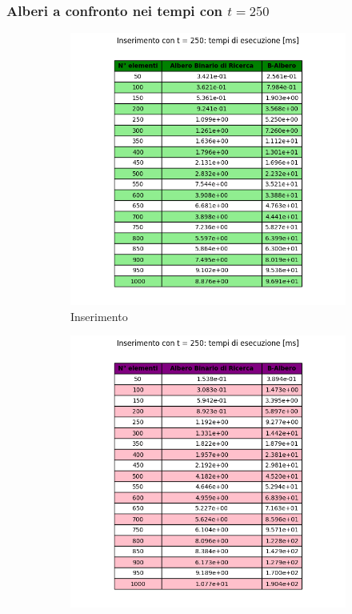 \subsubsection{Alberi a confronto nei tempi con $t = 250$}

\begin{figure}[H]
    \centering
    \begin{subfigure}[b]{0.49\textwidth}
        \centering
        \includegraphics[width=\textwidth]{tables/insert-ms-t250.png}
        \caption{Inserimento}
        \label{fig:tableinserttimet250}
    \end{subfigure}
    \hfill
    \begin{subfigure}[b]{0.49\textwidth}
        \centering
        \includegraphics[width=\textwidth]{tables/search-ms-t250.png}

\end{subfigure}
\end{figure}
